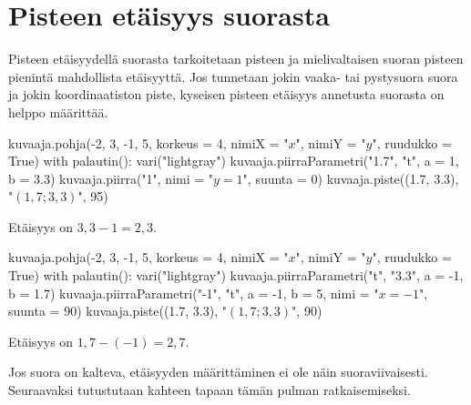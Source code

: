 \section{Pisteen etäisyys suorasta}


Pisteen etäisyydellä suorasta tarkoitetaan pisteen ja mielivaltaisen suoran pisteen pienintä mahdollista etäisyyttä.
Jos tunnetaan jokin vaaka- tai pystysuora suora ja jokin koordinaatiston piste, kyseisen pisteen etäisyys annetusta suorasta on helppo määrittää.

\begin{minipage}{0.45\textwidth}
\begin{kuva}
    kuvaaja.pohja(-2, 3, -1, 5, korkeus = 4, nimiX = "$x$", nimiY = "$y$", ruudukko = True)
    with palautin():
        vari("lightgray")
        kuvaaja.piirraParametri("1.7", "t", a = 1, b = 3.3)
    kuvaaja.piirra("1", nimi = "$y=1$", suunta = 0)
    kuvaaja.piste((1.7, 3.3), "$(1,7; 3,3)$", 95)
\end{kuva}

Etäisyys on $3,3-1=2,3$.
\end{minipage}
\begin{minipage}{0.45\textwidth}
\begin{kuva}
    kuvaaja.pohja(-2, 3, -1, 5, korkeus = 4, nimiX = "$x$", nimiY = "$y$", ruudukko = True)
    with palautin():
        vari("lightgray")
        kuvaaja.piirraParametri("t", "3.3", a = -1, b = 1.7)
    kuvaaja.piirraParametri("-1", "t", a = -1, b = 5, nimi = "$x = -1$", suunta = 90)
    kuvaaja.piste((1.7, 3.3), "$(1,7; 3,3)$", 90)
\end{kuva}

Etäisyys on $1,7-(-1)=2,7$.
\end{minipage}

Jos suora on kalteva, etäisyyden määrittäminen ei ole näin suoraviivaisesti.
Seuraavaksi tutustutaan kahteen tapaan tämän pulman ratkaisemiseksi.


